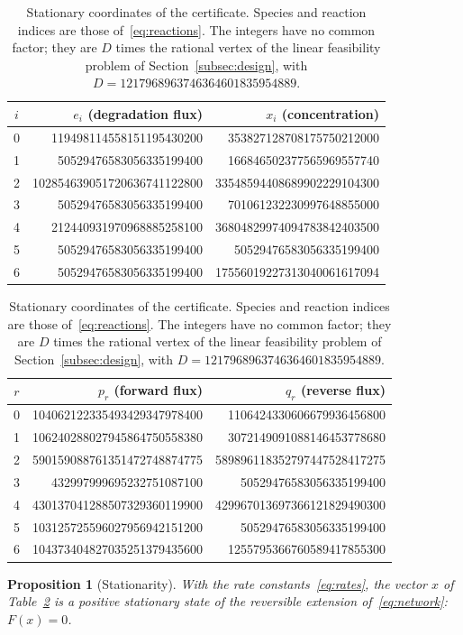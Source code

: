 \documentclass[11pt,a4paper]{article}
\theoremstyle{plain}
\newtheorem{proposition}[theorem]{Proposition}
\theoremstyle{definition}
\theoremstyle{remark}
\numberwithin{equation}{section}
\begin{document}
\begin{table}[t]
\centering\small
\begin{tabular}{@{}crr@{}}
\toprule
$i$ & $e_i$ (degradation flux) & $x_i$ (concentration) \\
\midrule
0 & 119498114558151195430200 & 353827128708175750212000 \\
1 & 50529476583056335199400 & 166846502377565969557740 \\
2 & 102854639051720636741122800 & 33548594408689902229104300 \\
3 & 50529476583056335199400 & 701061232230997648855000 \\
4 & 212440931970968885258100 & 36804829974094783842403500 \\
5 & 50529476583056335199400 & 50529476583056335199400 \\
6 & 50529476583056335199400 & 17556019227313040061617094 \\
\bottomrule
\end{tabular}

\medskip
\begin{tabular}{@{}crr@{}}
\toprule
$r$ & $p_r$ (forward flux) & $q_r$ (reverse flux) \\
\midrule
0 & 104062122335493429347978400 & 1106424330606679936456800 \\
1 & 106240288027945864750558380 & 3072149091088146453778680 \\
2 & 590159088761351472748874775 & 589896118352797447528417275 \\
3 & 432997999695232751087100 & 50529476583056335199400 \\
4 & 430137041288507329360119900 & 429967013697366121829490300 \\
5 & 103125725596027956942151200 & 50529476583056335199400 \\
6 & 104373404827035251379435600 & 1255795366760589417855300 \\
\bottomrule
\end{tabular}
\caption{Stationary coordinates of the certificate. Species and reaction indices are those of~\eqref{eq:reactions}. The integers have no common factor; they are $D$ times the rational vertex of the linear feasibility problem of Section~\ref{subsec:design}, with $D=1217968963746364601835954889$.}
\label{tab:data}
\end{table}

\begin{proposition}[Stationarity]\label{prop:stationary}
With the rate constants~\eqref{eq:rates}, the vector $x$ of Table~\ref{tab:data} is a positive stationary state of the reversible extension of~\eqref{eq:network}: $F(x)=0$.
\end{proposition}
\end{document}
